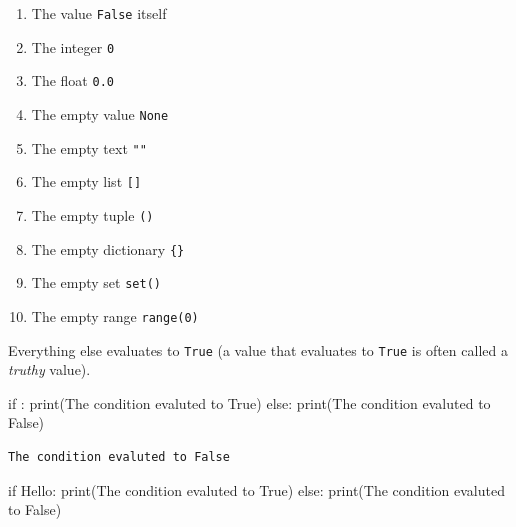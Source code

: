 \documentclass[
  letterpaper,
  DIV=11,
  numbers=noendperiod]{scrreprt}
\newenvironment{Shaded}{\begin{snugshade}}{\end{snugshade}}
\newcommand{\BuiltInTok}[1]{\textcolor[rgb]{0.00,0.23,0.31}{#1}}
\newcommand{\ControlFlowTok}[1]{\textcolor[rgb]{0.00,0.23,0.31}{#1}}
\newcommand{\NormalTok}[1]{\textcolor[rgb]{0.00,0.23,0.31}{#1}}
\newcommand{\StringTok}[1]{\textcolor[rgb]{0.13,0.47,0.30}{#1}}
\providecommand{\tightlist}{%
  \setlength{\itemsep}{0pt}\setlength{\parskip}{0pt}}\usepackage{longtable,booktabs,array}
\begin{document}
\begin{enumerate}
\def\labelenumi{\arabic{enumi}.}
\tightlist
\item
  The value \texttt{False} itself
\item
  The integer \texttt{0}
\item
  The float \texttt{0.0}
\item
  The empty value \texttt{None}
\item
  The empty text \texttt{""}
\item
  The empty list \texttt{{[}{]}}
\item
  The empty tuple \texttt{()}
\item
  The empty dictionary \texttt{\{\}}
\item
  The empty set \texttt{set()}
\item
  The empty range \texttt{range(0)}
\end{enumerate}

Everything else evaluates to \texttt{True} (a value that evaluates to
\texttt{True} is often called a \emph{truthy} value).

\begin{Shaded}
\begin{Highlighting}[]
\ControlFlowTok{if} \StringTok{\textquotesingle{}\textquotesingle{}}\NormalTok{:}
    \BuiltInTok{print}\NormalTok{(}\StringTok{\textquotesingle{}The condition evaluted to True\textquotesingle{}}\NormalTok{)}
\ControlFlowTok{else}\NormalTok{:}
    \BuiltInTok{print}\NormalTok{(}\StringTok{\textquotesingle{}The condition evaluted to False\textquotesingle{}}\NormalTok{)}
\end{Highlighting}
\end{Shaded}

\begin{verbatim}
The condition evaluted to False
\end{verbatim}

\begin{Shaded}
\begin{Highlighting}[]
\ControlFlowTok{if} \StringTok{\textquotesingle{}Hello\textquotesingle{}}\NormalTok{:}
    \BuiltInTok{print}\NormalTok{(}\StringTok{\textquotesingle{}The condition evaluted to True\textquotesingle{}}\NormalTok{)}
\ControlFlowTok{else}\NormalTok{:}
    \BuiltInTok{print}\NormalTok{(}\StringTok{\textquotesingle{}The condition evaluted to False\textquotesingle{}}\NormalTok{)}
\end{Highlighting}
\end{Shaded}
\end{document}
